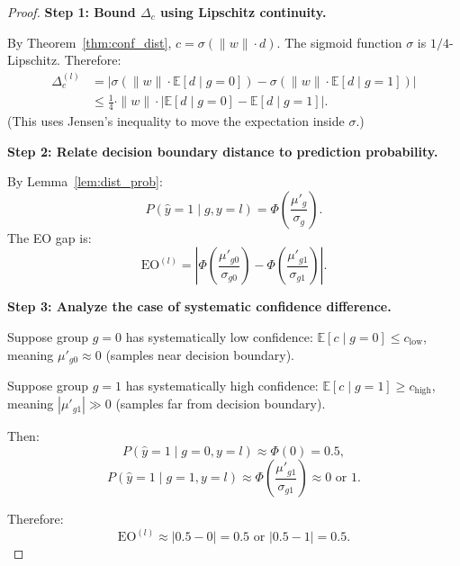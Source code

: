 \documentclass[11pt]{article}
\begin{document}
\begin{proof}
    \textbf{Step 1: Bound $\Delta_c$ using Lipschitz continuity.}

    By Theorem~\ref{thm:conf_dist}, $c = \sigma(\|w\| \cdot d)$. The sigmoid function $\sigma$ is $1/4$-Lipschitz. Therefore:
    \begin{align}
        \Delta_c^{(l)} &= |\sigma(\|w\| \cdot \mathbb{E}[d \mid g=0]) - \sigma(\|w\| \cdot \mathbb{E}[d \mid g=1])| \\
        &\leq \frac{1}{4} \cdot \|w\| \cdot |\mathbb{E}[d \mid g=0] - \mathbb{E}[d \mid g=1]|.
    \end{align}
    (This uses Jensen's inequality to move the expectation inside $\sigma$.)

    \textbf{Step 2: Relate decision boundary distance to prediction probability.}

    By Lemma~\ref{lem:dist_prob}:
    \begin{equation}
        P(\hat{y}=1 \mid g, y=l) = \Phi\!\left(\frac{\mu'_g}{\sigma_g}\right).
    \end{equation}
    The EO gap is:
    \begin{equation}
        \mathrm{EO}^{(l)} = \left|\Phi\!\left(\frac{\mu'_{g0}}{\sigma_{g0}}\right) - \Phi\!\left(\frac{\mu'_{g1}}{\sigma_{g1}}\right)\right|.
    \end{equation}

    \textbf{Step 3: Analyze the case of systematic confidence difference.}

    Suppose group $g=0$ has systematically low confidence: $\mathbb{E}[c \mid g=0] \leq c_{\text{low}}$, meaning $\mu'_{g0} \approx 0$ (samples near decision boundary).

    Suppose group $g=1$ has systematically high confidence: $\mathbb{E}[c \mid g=1] \geq c_{\text{high}}$, meaning $|\mu'_{g1}| \gg 0$ (samples far from decision boundary).

    Then:
    \begin{equation}
        P(\hat{y}=1 \mid g=0, y=l) \approx \Phi(0) = 0.5,
    \end{equation}
    \begin{equation}
        P(\hat{y}=1 \mid g=1, y=l) \approx \Phi\!\left(\frac{\mu'_{g1}}{\sigma_{g1}}\right) \approx 0 \text{ or } 1.
    \end{equation}

    Therefore:
    \begin{equation}
        \mathrm{EO}^{(l)} \approx |0.5 - 0| = 0.5 \text{ or } |0.5 - 1| = 0.5.
    \end{equation}


\end{proof}
\end{document}

